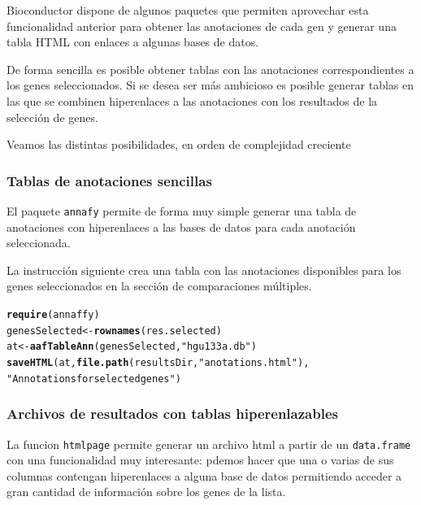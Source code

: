 \documentclass[a4paper]{article}\usepackage[]{graphicx}\usepackage[]{color}
\makeatletter
\newcommand{\hlstr}[1]{\textcolor[rgb]{0.192,0.494,0.8}{#1}}%
\newcommand{\hlstd}[1]{\textcolor[rgb]{0.345,0.345,0.345}{#1}}%
\newcommand{\hlkwb}[1]{\textcolor[rgb]{0.69,0.353,0.396}{#1}}%
\newcommand{\hlkwd}[1]{\textcolor[rgb]{0.737,0.353,0.396}{\textbf{#1}}}%
\newenvironment{kframe}{%
 \def\at@end@of@kframe{}%
 \ifinner\ifhmode%
  \def\at@end@of@kframe{\end{minipage}}%
  \begin{minipage}{\columnwidth}%
 \fi\fi%
 \def\FrameCommand##1{\hskip\@totalleftmargin \hskip-\fboxsep
 \colorbox{shadecolor}{##1}\hskip-\fboxsep
     \hskip-\linewidth \hskip-\@totalleftmargin \hskip\columnwidth}%
 \MakeFramed {\advance\hsize-\width
   \@totalleftmargin\z@ \linewidth\hsize
   \@setminipage}}%
 {\par\unskip\endMakeFramed%
 \at@end@of@kframe}
\newenvironment{knitrout}{}{} %
\newcommand{\Rfun}[1]{{\texttt{#1}}}
\makeatother
\begin{document}
Bioconductor dispone de algunos paquetes que permiten aprovechar esta funcionalidad anterior para obtener las anotaciones de cada gen y generar una tabla HTML con enlaces a algunas bases de datos.

De forma sencilla es posible obtener tablas con las anotaciones correspondientes a los genes seleccionados. Si se desea ser más ambicioso es posible generar tablas en las que se combinen hiperenlaces a las anotaciones con los resultados de la selección de genes.

Veamos las distintas posibilidades, en orden de complejidad creciente

\subsubsection{Tablas de anotaciones sencillas}

El paquete \texttt{annafy} permite de forma muy simple generar una tabla de anotaciones con hiperenlaces a las bases de datos para cada anotación seleccionada.

La instrucción siguiente crea una tabla con las anotaciones disponibles para los genes seleccionados en la sección de comparaciones múltiples.

\begin{knitrout}
\color{fgcolor}\begin{kframe}
\begin{alltt}
\hlkwd{require}\hlstd{(annaffy)}
\hlstd{genesSelected} \hlkwb{<-} \hlkwd{rownames}\hlstd{(res.selected)}
\hlstd{at} \hlkwb{<-} \hlkwd{aafTableAnn}\hlstd{(genesSelected,} \hlstr{"hgu133a.db"}\hlstd{)}
\hlkwd{saveHTML} \hlstd{(at,} \hlkwd{file.path}\hlstd{(resultsDir,} \hlstr{"anotations.html"}\hlstd{),}
          \hlstr{"Annotations for selected genes"}\hlstd{)}
\end{alltt}
\end{kframe}
\end{knitrout}


\subsubsection{Archivos de resultados con tablas hiperenlazables}

La funcion \Rfun{htmlpage} permite generar un archivo html a partir de un \Rfun{data.frame} con una funcionalidad muy interesante: pdemos hacer que una o varias de sus columnas contengan hiperenlaces a alguna base de datos permitiendo acceder a gran cantidad de información sobre los genes de la lista.
\end{document}
